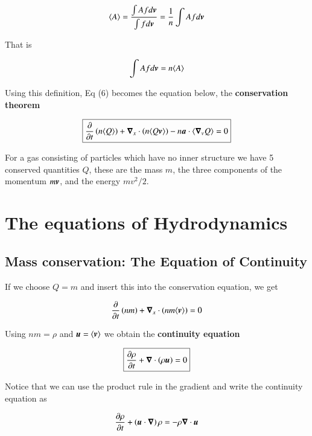 \begin{equation}
\langle A \rangle = \frac{\int A f d{\boldsymbol{v}}}{\int f d{\boldsymbol{v}}} = \frac{1}{n}\int A f d{\boldsymbol{v}}
\end{equation}

\noindent That is 

\begin{equation}
\int A f d{\boldsymbol{v}} = n \langle A \rangle
\end{equation}

Using this definition, Eq (6) becomes the equation below, the {\bf conservation theorem}

\begin{equation}
\boxed{
\frac{\partial }{\partial t} \left(n\langle Q \rangle\right) + {\boldsymbol{\nabla}}_x \cdot \left(n\langle Q  {\boldsymbol{v}} \rangle\right) - n{\boldsymbol{a}}\cdot \langle {\boldsymbol{\nabla}}_v Q \rangle = 0 
}
\end{equation}

For a gas consisting of particles which have no inner structure we have 5 conserved
quantities $Q$, these are the mass $m$, the three components of the momentum $m{\boldsymbol{v}}$, and the energy $mv^2/2$.


\section{The equations of Hydrodynamics}

\subsection{Mass conservation: The Equation of Continuity}

If we choose $Q = m$ and insert this into the conservation equation, we get

\begin{equation}
\frac{\partial }{\partial t} \left(n m\right) + {\boldsymbol{\nabla}}_x \cdot \left(nm\langle {\boldsymbol{v}} \rangle \right)  = 0 
\end{equation}

Using $nm=\rho$ and ${\boldsymbol{u}} = \langle {\boldsymbol{v}} \rangle$ we
obtain the {\bf continuity equation}

\begin{equation}
\boxed{
\frac{\partial \rho}{\partial t}  + {\boldsymbol{\nabla}} \cdot \left(\rho {\boldsymbol{u}} \right)  = 0 
}
\end{equation}

Notice that we can use the product rule in the gradient and write the continuity equation as

\begin{equation}
\frac{\partial \rho}{\partial t}  + \left({\boldsymbol{u}} \cdot {\boldsymbol{\nabla}}\right) \rho = - \rho {\boldsymbol{\nabla}} \cdot  {\boldsymbol{u}}
\end{equation}


